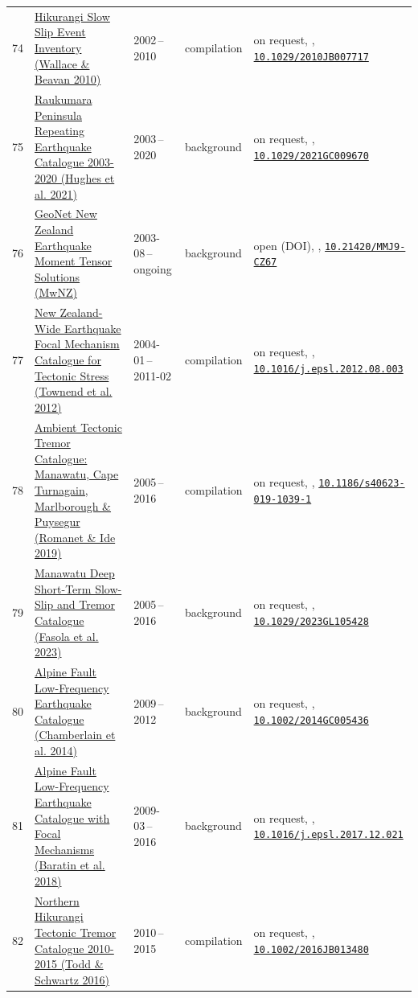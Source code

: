 \documentclass[10pt,a4paper]{article}
\begin{document}
\begin{small}
\begin{longtable}{@{}r L{4.5cm} L{1.9cm} L{1.6cm} L{5.7cm}@{}}
74 & \hyperlink{c:74}{Hikurangi Slow Slip Event Inventory (Wallace \& Beavan 2010)} & 2002\,--\,2010 & compilation & on request, \cite{Wallace2010}, {\footnotesize \href{https://doi.org/10.1029/2010JB007717}{\nolinkurl{10.1029/2010JB007717}}} \\
75 & \hyperlink{c:75}{Raukumara Peninsula Repeating Earthquake Catalogue 2003-2020 (Hughes et al. 2021)} & 2003\,--\,2020 & background & on request, \cite{Hughes2021}, {\footnotesize \href{https://doi.org/10.1029/2021GC009670}{\nolinkurl{10.1029/2021GC009670}}} \\
76 & \hyperlink{c:76}{GeoNet New Zealand Earthquake Moment Tensor Solutions (MwNZ)} & 2003-08\,--\,ongoing & background & open (DOI), \cite{GNSScience2006}, {\footnotesize \href{https://doi.org/10.21420/MMJ9-CZ67}{\nolinkurl{10.21420/MMJ9-CZ67}}} \\
77 & \hyperlink{c:77}{New Zealand-Wide Earthquake Focal Mechanism Catalogue for Tectonic Stress (Townend et al. 2012)} & 2004-01\,--\,2011-02 & compilation & on request, \cite{Townend2012}, {\footnotesize \href{https://doi.org/10.1016/j.epsl.2012.08.003}{\nolinkurl{10.1016/j.epsl.2012.08.003}}} \\
78 & \hyperlink{c:78}{Ambient Tectonic Tremor Catalogue: Manawatu, Cape Turnagain, Marlborough \& Puysegur (Romanet \& Ide 2019)} & 2005\,--\,2016 & compilation & on request, \cite{Romanet2019}, {\footnotesize \href{https://doi.org/10.1186/s40623-019-1039-1}{\nolinkurl{10.1186/s40623-019-1039-1}}} \\
79 & \hyperlink{c:79}{Manawatu Deep Short-Term Slow-Slip and Tremor Catalogue (Fasola et al. 2023)} & 2005\,--\,2016 & background & on request, \cite{Fasola2023}, {\footnotesize \href{https://doi.org/10.1029/2023GL105428}{\nolinkurl{10.1029/2023GL105428}}} \\
80 & \hyperlink{c:80}{Alpine Fault Low-Frequency Earthquake Catalogue (Chamberlain et al. 2014)} & 2009\,--\,2012 & background & on request, \cite{Chamberlain2014}, {\footnotesize \href{https://doi.org/10.1002/2014GC005436}{\nolinkurl{10.1002/2014GC005436}}} \\
81 & \hyperlink{c:81}{Alpine Fault Low-Frequency Earthquake Catalogue with Focal Mechanisms (Baratin et al. 2018)} & 2009-03\,--\,2016 & background & on request, \cite{Baratin2018}, {\footnotesize \href{https://doi.org/10.1016/j.epsl.2017.12.021}{\nolinkurl{10.1016/j.epsl.2017.12.021}}} \\
82 & \hyperlink{c:82}{Northern Hikurangi Tectonic Tremor Catalogue 2010-2015 (Todd \& Schwartz 2016)} & 2010\,--\,2015 & compilation & on request, \cite{Todd2016}, {\footnotesize \href{https://doi.org/10.1002/2016JB013480}{\nolinkurl{10.1002/2016JB013480}}} \\

\end{longtable}
\end{small}
\end{document}
